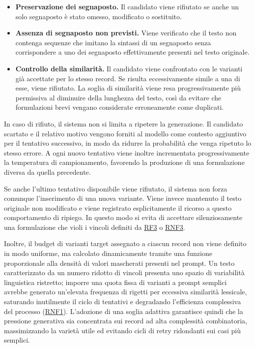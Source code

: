 \documentclass[12pt,a4paper,openright,twoside]{book}
\begin{document}
\begin{itemize}
    \item \textbf{Preservazione dei segnaposto.} Il candidato viene rifiutato se
          anche un solo segnaposto è stato omesso, modificato o sostituito.

    \item \textbf{Assenza di segnaposto non previsti.} Viene verificato che il
          testo non contenga sequenze che imitano la sintassi di un segnaposto
          senza corrispondere a uno dei segnaposto effettivamente presenti nel
          testo originale.

    \item \textbf{Controllo della similarità.} Il candidato viene confrontato
          con le varianti già accettate per lo stesso record. Se risulta
          eccessivamente simile a una di esse, viene rifiutato. La soglia di
          similarità viene resa progressivamente più permissiva al diminuire
          della lunghezza del testo, così da evitare che formulazioni brevi
          vengano considerate erroneamente come duplicati.
\end{itemize}

In caso di rifiuto, il sistema non si limita a ripetere la generazione. Il
candidato scartato e il relativo motivo vengono forniti al modello come contesto
aggiuntivo per il tentativo successivo, in modo da ridurre la probabilità che
venga ripetuto lo stesso errore. A ogni nuovo tentativo viene inoltre
incrementata progressivamente la temperatura di campionamento, favorendo la
produzione di una formulazione diversa da quella precedente.

Se anche l'ultimo tentativo disponibile viene rifiutato, il sistema non forza
comunque l'inserimento di una nuova variante. Viene invece mantenuto il testo
originale non modificato e viene registrato esplicitamente il ricorso a questo
comportamento di ripiego. In questo modo si evita di accettare silenziosamente
una formulazione che violi i vincoli definiti da \hyperref[rf:RF3]{RF3} o
\hyperref[rnf:RNF3]{RNF3}.

Inoltre, il budget di varianti target assegnato a ciascun record non viene
definito in modo uniforme, ma calcolato dinamicamente tramite una funzione
proporzionale alla densità di valori mascherati presenti nel prompt. Un testo
caratterizzato da un numero ridotto di vincoli presenta uno spazio di
variabilità linguistica ristretto; imporre una quota fissa di varianti a prompt
semplici avrebbe generato un'elevata frequenza di rigetti per eccessiva
similarità lessicale, saturando inutilmente il ciclo di tentativi e degradando
l'efficienza complessiva del processo (\hyperref[rnf:RNF1]{RNF1}). L'adozione di
una soglia adattiva garantisce quindi che la pressione generativa sia
concentrata sui record ad alta complessità combinatoria, massimizzando la
varietà utile ed evitando cicli di retry ridondanti sui casi più semplici.
\end{document}

